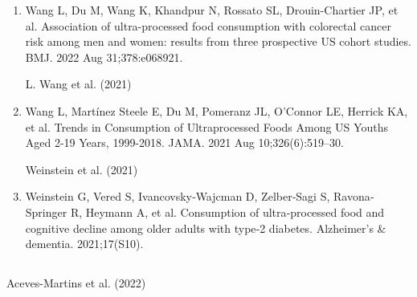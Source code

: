 \documentclass[
]{article}
\begin{document}
\begin{enumerate}
  (\textbf{wang2022?})
\item
  Wang L, Du M, Wang K, Khandpur N, Rossato SL, Drouin-Chartier JP, et
  al. Association of ultra-processed food consumption with colorectal
  cancer risk among men and women: results from three prospective US
  cohort studies. BMJ. 2022 Aug 31;378:e068921.

  L. Wang et al. (2021)
\item
  Wang L, Martínez Steele E, Du M, Pomeranz JL, O'Connor LE, Herrick KA,
  et al. Trends in Consumption of Ultraprocessed Foods Among US Youths
  Aged 2-19 Years, 1999-2018. JAMA. 2021 Aug 10;326(6):519--30.

  Weinstein et al. (2021)
\item
  Weinstein G, Vered S, Ivancovsky‐Wajcman D, Zelber‐Sagi S,
  Ravona‐Springer R, Heymann A, et al. Consumption of ultra‐processed
  food and cognitive decline among older adults with type‐2 diabetes.
  Alzheimer's \& dementia. 2021;17(S10).
\end{enumerate}

\hypertarget{section}{%
\subsection{}\label{section}}

Aceves-Martins et al. (2022)
\end{document}
